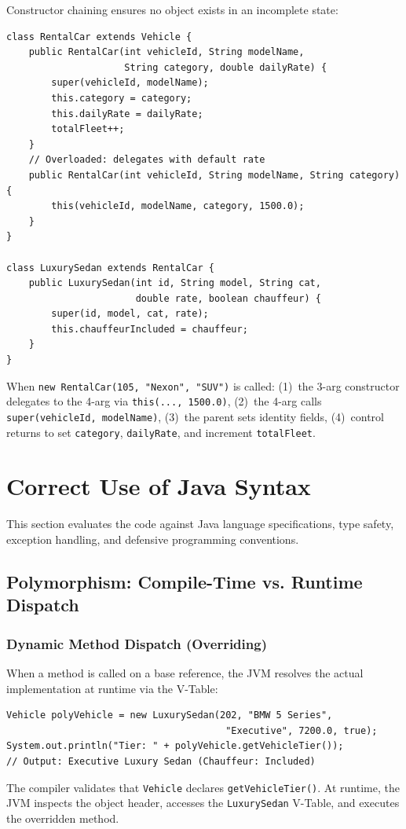 \documentclass[11pt,a4paper]{article}
\begin{document}
Constructor chaining ensures no object exists in an incomplete state:
\begin{lstlisting}[caption={Constructor Chaining in RentalCar and LuxurySedan}]
class RentalCar extends Vehicle {
    public RentalCar(int vehicleId, String modelName,
                     String category, double dailyRate) {
        super(vehicleId, modelName);
        this.category = category;
        this.dailyRate = dailyRate;
        totalFleet++;
    }
    // Overloaded: delegates with default rate
    public RentalCar(int vehicleId, String modelName, String category) {
        this(vehicleId, modelName, category, 1500.0);
    }
}

class LuxurySedan extends RentalCar {
    public LuxurySedan(int id, String model, String cat,
                       double rate, boolean chauffeur) {
        super(id, model, cat, rate);
        this.chauffeurIncluded = chauffeur;
    }
}
\end{lstlisting}

When \texttt{new RentalCar(105, "Nexon", "SUV")} is called: (1)~the 3-arg constructor delegates to the 4-arg via \texttt{this(..., 1500.0)}, (2)~the 4-arg calls \texttt{super(vehicleId, modelName)}, (3)~the parent sets identity fields, (4)~control returns to set \texttt{category}, \texttt{dailyRate}, and increment \texttt{totalFleet}.

\newpage
\section{Correct Use of Java Syntax}
\label{sec:syntax}

This section evaluates the code against Java language specifications, type safety, exception handling, and defensive programming conventions.

\subsection{Polymorphism: Compile-Time vs. Runtime Dispatch}

\subsubsection{Dynamic Method Dispatch (Overriding)}
When a method is called on a base reference, the JVM resolves the actual implementation at runtime via the V-Table:
\begin{lstlisting}[caption={Dynamic Method Dispatch via Base Reference}]
Vehicle polyVehicle = new LuxurySedan(202, "BMW 5 Series",
                                       "Executive", 7200.0, true);
System.out.println("Tier: " + polyVehicle.getVehicleTier());
// Output: Executive Luxury Sedan (Chauffeur: Included)
\end{lstlisting}
The compiler validates that \texttt{Vehicle} declares \texttt{getVehicleTier()}. At runtime, the JVM inspects the object header, accesses the \texttt{LuxurySedan} V-Table, and executes the overridden method.
\end{document}
